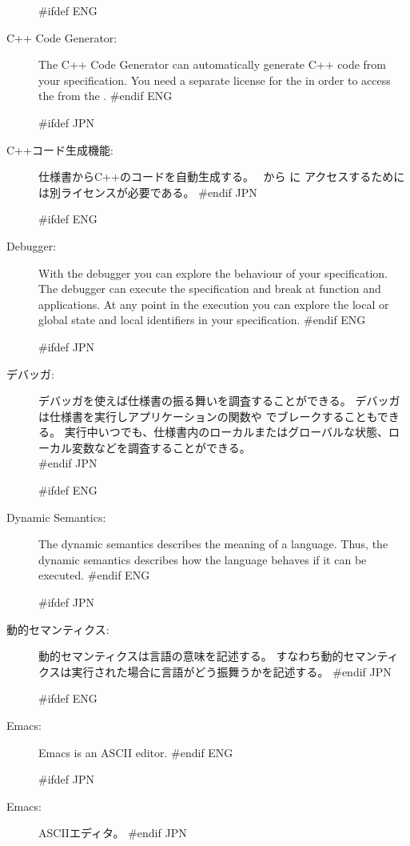 \begin{description}

#ifdef ENG
\item[C++ Code Generator:] The C++ Code Generator can automatically generate
  C++ code from your specification. You need a separate
  license for the  in order to access the
   from the \Toolbox.
#endif ENG
  
#ifdef JPN
\item[C++コード生成機能:] 仕様書からC++のコードを自動生成する。
  \Toolbox\ から に
  アクセスするためには別ライセンスが必要である。
#endif JPN
  
#ifdef ENG
\item[Debugger:] With the debugger you can explore the behaviour of
  your specification. The debugger can execute the specification and
  break at function and
   applications. At
  any point in the execution you can explore the local or global state
  and local identifiers in your specification.
#endif ENG

#ifdef JPN
\item[デバッガ:] デバッガを使えば仕様書の振る舞いを調査することができる。
  デバッガは仕様書を実行しアプリケーションの関数や
   でブレークすることもできる。
  実行中いつでも、仕様書内のローカルまたはグローバルな状態、ローカル変数などを調査することができる。\\
#endif JPN


#ifdef ENG
\item[Dynamic Semantics:] The dynamic semantics describes the meaning
  of a language. Thus, the dynamic semantics describes
  how the language behaves if it can be executed.
#endif ENG

#ifdef JPN
\item[動的セマンティクス:] 動的セマンティクスは言語の意味を記述する。
  すなわち動的セマンティクスは実行された場合に言語がどう振舞うかを記述する。
#endif JPN

#ifdef ENG
\item[Emacs:] Emacs is an ASCII editor.
#endif ENG

#ifdef JPN
\item[Emacs:] ASCIIエディタ。
#endif JPN


\end{description}

